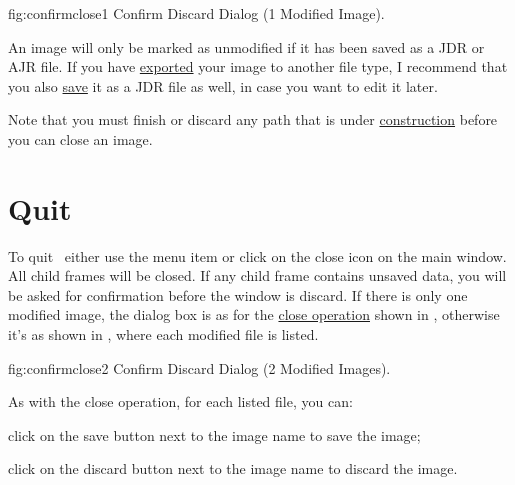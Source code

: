 \FloatFig
  {fig:confirmclose1}
  {}
  {Confirm Discard Dialog (1 Modified Image).}

An image will only be marked as unmodified if it has been saved as a
\gls{JDR} or \gls{AJR} file.  If you have
\hyperref[sec:exportimage]{exported} your image to another file
type, I recommend that you also \hyperref[sec:saveimage]{save} it as
a \gls{JDR} file as well, in case you want to edit it later.

Note that you must finish or discard any \gls{path} that is under
\hyperref[sec:newobjects]{construction} before you can close
an image.

\section{Quit}\label{sec:quit}


To quit \FlowframTk\ either use the menu item
 or click on the close icon on the
main window. All child frames will be closed. If any child frame
contains unsaved data, you will be asked for confirmation before
the window is discard. If there is only one modified image, the
dialog box is as for the \hyperref[sec:closeimage]{close operation} shown in
, otherwise it's as shown in
, where each modified file is listed.

\FloatFig
  {fig:confirmclose2}
  {}
  {Confirm Discard Dialog (2 Modified Images).}

As with the close operation, for each listed file, you can:
\begin{deflist}

\begin{itemdesc}
click on the save button next to the image name to save the image;
\end{itemdesc}


\begin{itemdesc}
click on the discard button next to the image name to discard the
image.
\end{itemdesc}

\end{deflist}

